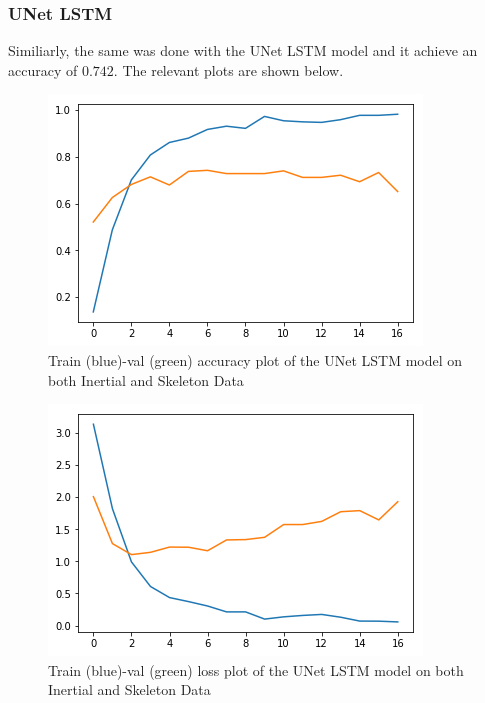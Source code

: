 \documentclass[conference]{IEEEtran}
\begin{document}
\subsubsection{UNet LSTM}
Similiarly, the same was done with the UNet LSTM model and it achieve an accuracy of $0.742$. The relevant plots are shown below.
\begin{figure}[H]
\begin{center}
\includegraphics[scale=0.4]{UNet_LSTM_iner_skel/UNet_LSTM_acc_plot_iner_skel.png}
\end{center}
\caption{\label{fig:train_val_acc_UNet_LSTM_iner_skel} 
Train (blue)-val (green) accuracy plot of the UNet LSTM model on both Inertial and Skeleton Data}
\end{figure}
\begin{figure}[H]
\begin{center}
\includegraphics[scale=0.4]{UNet_LSTM_iner_skel/UNet_LSTM_loss_plot_iner_skel.png}
\end{center}
\caption{\label{fig:train_val_loss_UNet_LSTM_iner_skel} 
Train (blue)-val (green) loss plot of the UNet LSTM model on both Inertial and Skeleton Data}
\end{figure}
\end{document}
